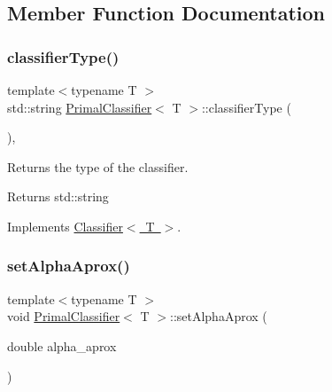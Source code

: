 \subsection{Member Function Documentation}
\mbox{\label{class_primal_classifier_a637fc3cb89994277e902758c7fc3f763}} 
\subsubsection{\texorpdfstring{classifier\+Type()}{classifierType()}}
{\footnotesize\ttfamily template$<$typename T $>$ \\
std\+::string \mbox{\hyperlink{class_primal_classifier}{Primal\+Classifier}}$<$ T $>$\+::classifier\+Type (\begin{DoxyParamCaption}{ }\end{DoxyParamCaption})\hspace{0.3cm}{\ttfamily [inline]}, {\ttfamily [virtual]}}



Returns the type of the classifier. 

\begin{DoxyReturn}{Returns}
std\+::string 
\end{DoxyReturn}


Implements \mbox{\hyperlink{class_classifier_ab40f42f957ec50939bd9a6b0cd5d1786}{Classifier$<$ T $>$}}.

\mbox{\label{class_primal_classifier_a049f4814d38b456c80c40cee5595502b}} 
\subsubsection{\texorpdfstring{set\+Alpha\+Aprox()}{setAlphaAprox()}}
{\footnotesize\ttfamily template$<$typename T $>$ \\
void \mbox{\hyperlink{class_primal_classifier}{Primal\+Classifier}}$<$ T $>$\+::set\+Alpha\+Aprox (\begin{DoxyParamCaption}\item[{double}]{alpha\+\_\+aprox }\end{DoxyParamCaption})\hspace{0.3cm}{\ttfamily [inline]}}



